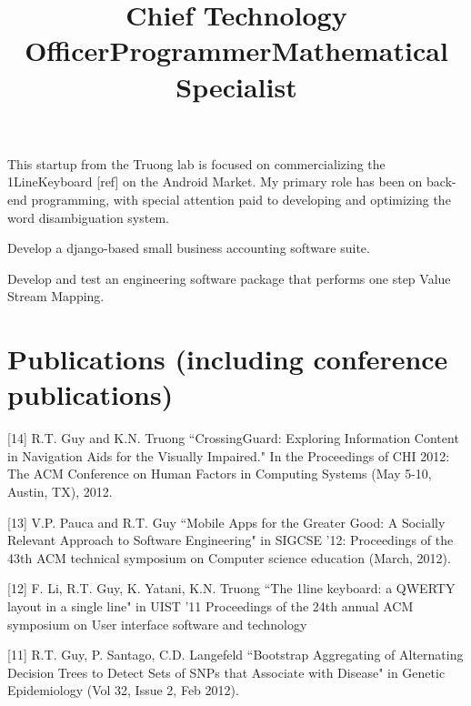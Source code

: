\documentclass[overlapped,line,letterpaper]{res}
\begin{document}
\begin{resume}
 \title{Chief Technology Officer}
 \begin{position}
  This startup from the Truong lab is focused on commercializing the 1LineKeyboard [ref] on the Android Market. My primary role has been on back-end programming, with special attention paid to developing and optimizing the word disambiguation system. 
 \end{position}

 \title{Programmer}
 \begin{position}
   Develop a django-based small business accounting software suite. 
 \end{position}

 \title{Mathematical Specialist}
 \begin{position}
    Develop and test an engineering software package that performs one step Value Stream Mapping.
 \end{position}



\section{\bf Publications (including conference publications)}

[14] R.T. Guy and K.N. Truong ``CrossingGuard: Exploring Information Content in Navigation Aids for the Visually Impaired." In the Proceedings of CHI 2012: The ACM Conference on Human Factors in Computing Systems (May 5-10, Austin, TX), 2012.

[13] V.P. Pauca and R.T. Guy ``Mobile Apps for the Greater Good: A Socially Relevant Approach to Software Engineering" in SIGCSE '12: Proceedings of the 43th ACM technical symposium on Computer science education (March, 2012).

[12] F. Li, R.T. Guy, K. Yatani, K.N. Truong ``The 1line keyboard: a QWERTY layout in a single line" in UIST '11 Proceedings of the 24th annual ACM symposium on User interface software and technology

[11] R.T. Guy, P. Santago, C.D. Langefeld ``Bootstrap Aggregating of Alternating Decision Trees to Detect Sets of SNPs that Associate with Disease" in Genetic Epidemiology (Vol 32, Issue 2, Feb 2012). 


\end{resume}
\end{document}
